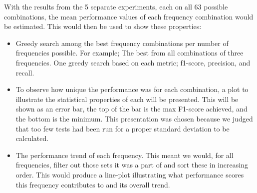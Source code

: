         With the results from the 5 separate experiments, each on all 63 possible combinations, the mean performance values of each frequency combination would be estimated. This would then be used to show these properties:
        \begin{itemize}

            \item Greedy search among the best frequency combinations per number of frequencies possible. For example; The best from all combinations of three frequencies. One greedy search based on each metric; f1-score, precision, and recall.
            \item To observe how unique the performance was for each combination, a plot to illustrate the statistical properties of each will be presented. This will be shown as an error bar, the top of the bar is the max F1-score achieved, and the bottom is the minimum. This presentation was chosen because we judged that too few tests had been run for a proper standard deviation to be calculated.
            \item The performance trend of each frequency. This meant we would, for all frequencies, filter out those sets it was a part of and sort these in increasing order. This would produce a line-plot illustrating what performance scores this frequency contributes to and its overall trend.
        \end{itemize}
    


    
